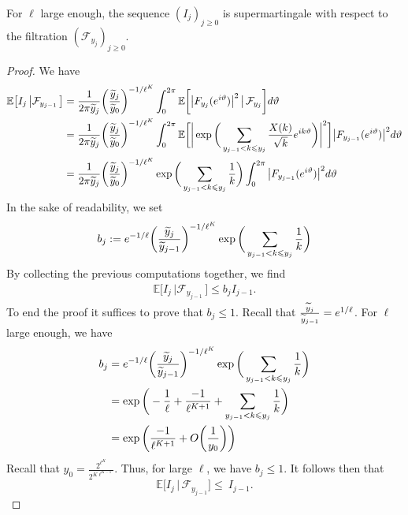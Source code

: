 \documentclass[10pt,a4paper]{amsart}
\begin{document}
\begin{lemma}\label{lemma_I_j_sousmartingale_chap2}
For $\ell$ large enough, the sequence $(I_j)_{j\geqslant 0}$ is supermartingale with respect to the filtration $(\mathcal{F}_{y_j})_{j\geqslant 0}$.
\end{lemma}

\begin{proof}[Proof]
    We have
    $$
    \begin{aligned}
        \mathbb{E}\big[I_{j} \, \big| \mathcal{F}_{y_{j-1}}\,\big] & = \frac{1}{2\pi\widetilde{y}_j} \bigg(\frac{\widetilde{y}_{j}}{\widetilde{y}_{0}}\bigg)^{-1/\ell^K}\int_{0}^{2\pi } \mathbb{E}\bigg[ \big|F_{y_j}({\rm e}^{i\vartheta})\big|^2\, \big| \, \mathcal{F}_{y_j}\bigg]{\rm d}\vartheta 
        \\ & = \frac{1}{2\pi\widetilde{y}_j} \bigg(\frac{\widetilde{y}_{j}}{\widetilde{y}_{0}}\bigg)^{-1/\ell^K}\int_{0}^{2\pi } \mathbb{E}\bigg[ \bigg| \exp\bigg( \sum_{y_{j-1}<k\leqslant y_j}\frac{X(k)}{\sqrt{k}} {\rm e}^{ik\vartheta}\bigg)\bigg|^2\bigg]\big|F_{y_{j-1}}({\rm e}^{i\vartheta})\big|^2{\rm d}\vartheta 
        \\ & = \frac{1}{2\pi\widetilde{y}_j} \bigg(\frac{\widetilde{y}_{j}}{\widetilde{y}_{0}}\bigg)^{-1/\ell^K} \exp\bigg( \sum_{y_{j-1}<k\leqslant y_j}\frac{1}{k} \bigg)\int_{0}^{2\pi }  \big|F_{y_{j-1}}({\rm e}^{i\vartheta})\big|^2{\rm d}\vartheta 
    \end{aligned}
    $$
   In the sake of readability, we set
   $$
   b_j:= {\rm e}^{-1/\ell} \bigg(\frac{\widetilde{y}_{j}}{\widetilde{y}_{j-1}}\bigg)^{-1/\ell^K} \exp\bigg( \sum_{y_{j-1}<k\leqslant y_j}\frac{1}{k} \bigg) 
   $$
    By collecting the previous computations together, we find
    $$
    \begin{aligned}
        \mathbb{E}\big[I_{j} \, \big| \mathcal{F}_{y_{j-1}}\,\big] \leqslant b_jI_{j-1}.
    \end{aligned}
    $$
    To end the proof it suffices to prove that $b_j\leqslant 1$. Recall that $\frac{\widetilde{y}_j}{\widetilde{y}_{j-1}}={\rm e}^{1/\ell}$.
    For $\ell$ large enough, we have
$$
\begin{aligned}
b_j & = {\rm e}^{-1/\ell} \bigg(\frac{\widetilde{y}_{j}}{\widetilde{y}_{j-1}}\bigg)^{-1/\ell^K} \exp\bigg( \sum_{y_{j-1}<k\leqslant y_j}\frac{1}{k} \bigg) 
\\ & = \exp \bigg( -\frac{1}{\ell} + \frac{-1}{\ell^{K+1}}+\sum_{y_{j-1} <   k \leqslant y_{j}} \frac{1}{k}  \bigg) 
 \\ & = \exp \bigg(\frac{-1}{\ell^{K+1}} +O\bigg(\frac{1}{y_0}\bigg) \bigg)
\end{aligned}
$$
Recall that $y_0=\frac{2^{\ell^K}}{2^{K\ell^{K-1}}}$. Thus, for large $\ell$, we have $b_j\leqslant 1$.
It follows then that $$\mathbb{E}\big[I_{j} \, \big| \,\mathcal{F}_{y_{j-1}}\big] \leqslant ~ I_{j-1}.$$
\end{proof}
\end{document}
